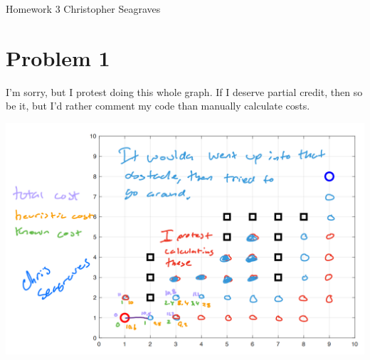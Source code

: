 \documentclass{article}
\begin{document}
    \raggedright
    Homework 3 \break
    Christopher Seagraves

    \section*{Problem 1}
        \begin{minipage}{\linewidth}
            \raggedright
            I'm sorry, but I protest doing this whole graph. If I deserve partial credit, then so be it, but I'd rather comment my code than manually calculate costs.
            \begin{center}
                \includegraphics[width=\linewidth]{HW3P1 AStar by hand.png}
            \end{center}
        \end{minipage}
    
\end{document}
